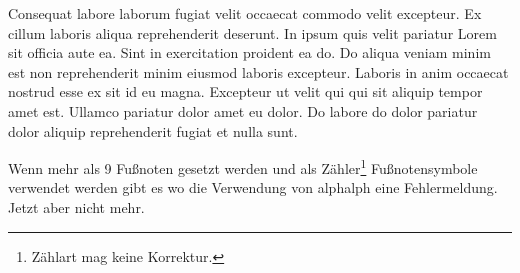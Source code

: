 \documentclass{scrreprt}
\begin{document}
Consequat labore laborum fugiat velit occaecat commodo velit excepteur. Ex cillum laboris aliqua reprehenderit deserunt. In ipsum quis velit pariatur Lorem sit officia aute ea. Sint in exercitation proident ea do. Do aliqua veniam minim est non reprehenderit minim eiusmod laboris excepteur. Laboris in anim occaecat nostrud esse ex sit id eu magna. Excepteur ut velit qui qui sit aliquip tempor amet est. Ullamco pariatur dolor amet eu dolor. Do labore do dolor pariatur dolor aliquip reprehenderit fugiat et nulla sunt.

\begin{minipage}{\linewidth}
	
\end{minipage}

\setcounter{footnote}{9}
Wenn mehr als 9 Fußnoten gesetzt werden und als Zähler\footnote{Zählart
	mag keine Korrektur.} Fußnotensymbole verwendet werden gibt es wo die
Verwendung von alphalph eine Fehlermeldung. Jetzt aber nicht mehr.

\printbibliography
\listoffigures

\end{document}
